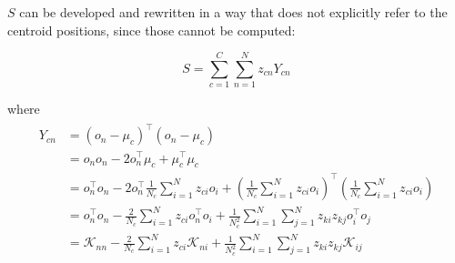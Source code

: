 \documentclass[10pt,letterpaper]{article}
\begin{document}
$S$ can be developed and rewritten in a way that does not explicitly refer to the centroid positions, since those cannot be computed:

\[
S = \sum_{c=1}^{C} \sum_{n=1}^{N} z_{cn} Y_{cn}
\]

where
\begin{align}
\begin{split}
Y_{cn} & =  \left(o_n-\mu_c\right)^\top\left(o_n-\mu_c\right) \\
       & =  o_no_n - 2 o_n^\top \mu_c + \mu_c^\top \mu_c \\
       & =  o_n^\top o_n - 2 o_n^\top \frac{1}{N_c} \sum_{i=1}^{N} z_{ci} o_i +
       	 \left(\frac{1}{N_c} \sum_{i=1}^{N} z_{ci} o_i\right)^\top
         \left(\frac{1}{N_c} \sum_{i=1}^{N} z_{ci} o_i\right)\\
       & =  o_n^\top o_n - \frac{2}{N_c} \sum_{i=1}^{N} z_{ci} o_n^\top o_i +
       	 \frac{1}{N_c^2} \sum_{i=1}^{N} \sum_{j=1}^{N} z_{ki} z_{kj} o_i^\top o_j \\
       & =  \mathcal{K}_{nn} - \frac{2}{N_c} \sum_{i=1}^{N} z_{ci} \mathcal{K}_{ni} +
         \frac{1}{N_c^2} \sum_{i=1}^{N} \sum_{j=1}^{N} z_{ki} z_{kj} \mathcal{K}_{ij} \label{eq:yki}
\end{split}
\end{align}


\end{document}
